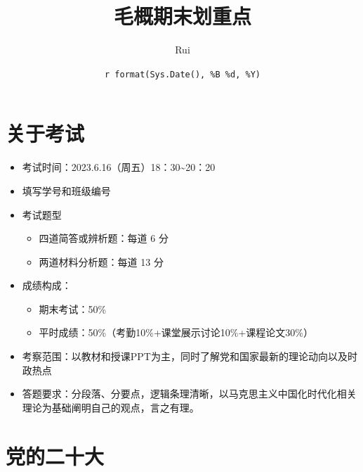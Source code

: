 \documentclass[
]{ctexart}
\title{毛概期末划重点}
\author{Rui}
\date{\texttt{r\ format(Sys.Date(),\ \textquotesingle{}\%B\ \%d,\ \%Y\textquotesingle{})}}
\providecommand{\tightlist}{%
  \setlength{\itemsep}{0pt}\setlength{\parskip}{0pt}}
\begin{document}
\maketitle

\renewcommand*\contentsname{目录}
{
\setcounter{tocdepth}{3}
\tableofcontents
}
\hypertarget{ux5173ux4e8eux8003ux8bd5}{%
\section{关于考试}\label{ux5173ux4e8eux8003ux8bd5}}

\begin{itemize}
\tightlist
\item
  考试时间：2023.6.16（周五）18：30\textasciitilde20：20
\item
  填写学号和班级编号
\item
  考试题型

  \begin{itemize}
  \tightlist
  \item
    四道简答或辨析题：每道 6 分
  \item
    两道材料分析题：每道 13 分
  \end{itemize}
\item
  成绩构成：

  \begin{itemize}
  \tightlist
  \item
    期末考试：50\%
  \item
    平时成绩：50\%（考勤10\%+课堂展示讨论10\%+课程论文30\%）
  \end{itemize}
\item
  考察范围：以教材和授课PPT为主，同时了解党和国家最新的理论动向以及时政热点
\item
  答题要求：分段落、分要点，逻辑条理清晰，以马克思主义中国化时代化相关理论为基础阐明自己的观点，言之有理。
\end{itemize}

\hypertarget{ux515aux7684ux4e8cux5341ux5927}{%
\section{党的二十大}\label{ux515aux7684ux4e8cux5341ux5927}}
\end{document}
